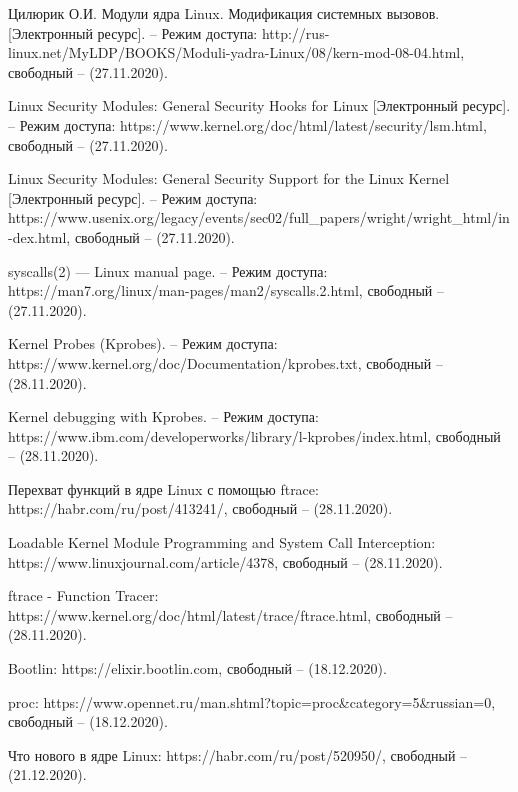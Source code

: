 \documentclass[a4paper,14pt]{article}
\begin{document}
\newpage
\begin{thebibliography}{3}

Цилюрик О.И. Модули ядра Linux. Модификация системных вызовов. [Электронный ресурс]. -- Режим доступа: http://rus-linux.net/MyLDP/BOOKS/Moduli-yadra-Linux/08/kern-mod-08-04.html, свободный -- (27.11.2020).

Linux Security Modules: General Security Hooks for Linux [Электронный ресурс]. -- Режим доступа: https://www.kernel.org/doc/html/latest/security/lsm.html, свободный -- (27.11.2020).

Linux Security Modules:
General Security Support for the Linux Kernel [Электронный ресурс]. -- Режим доступа: https://www.usenix.org/legacy/events/sec02/full\_papers/wright/wright\_html/in-dex.html, свободный -- (27.11.2020).

syscalls(2) — Linux manual page. -- Режим доступа: https://man7.org/linux/man-pages/man2/syscalls.2.html, свободный -- (27.11.2020).

Kernel Probes (Kprobes). -- Режим доступа: https://www.kernel.org/doc/Documentation/kprobes.txt, свободный -- (28.11.2020).

Kernel debugging with Kprobes. -- Режим доступа: https://www.ibm.com/developerworks/library/l-kprobes/index.html, свободный -- (28.11.2020).

Перехват функций в ядре Linux с помощью ftrace: https://habr.com/ru/post/413241/, свободный -- (28.11.2020).

Loadable Kernel Module Programming and System Call Interception: https://www.linuxjournal.com/article/4378, свободный -- (28.11.2020).

ftrace - Function Tracer: https://www.kernel.org/doc/html/latest/trace/ftrace.html, свободный -- (28.11.2020).


Bootlin: https://elixir.bootlin.com, свободный -- (18.12.2020).

proc: https://www.opennet.ru/man.shtml?topic=proc\&category=5\&russian=0, свободный -- (18.12.2020).

Что нового в ядре Linux: https://habr.com/ru/post/520950/, свободный -- (21.12.2020).

\end{thebibliography}

\newpage
\appendix
\end{document}
